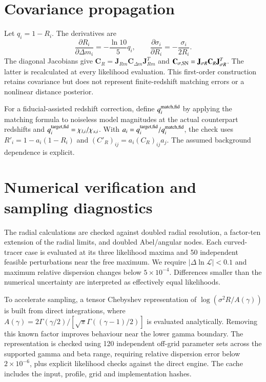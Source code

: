 \documentclass{aa}
\begin{document}
\section{Covariance propagation}\label{sec:propagation}
Let $q_i=1-R_i$. The derivatives are
\begin{equation}
\frac{\partial R_i}{\partial\Delta m_i}=-\frac{\ln10}{5}q_i,\qquad
\frac{\partial\sigma_i}{\partial R_i}=-\frac{\sigma_i}{2R_i}.
\end{equation}
The diagonal Jacobians give $\mathbf C_R=\mathbf J_{Rm}\mathbf C_{\Delta m}\mathbf J_{Rm}^{T}$ and $\mathbf C_{\sigma,{\rm SN}}=\mathbf J_{\sigma R}\mathbf C_R\mathbf J_{\sigma R}^{T}$. The latter is recalculated at every likelihood evaluation. This first-order construction retains covariance but does not represent finite-redshift matching errors or a nonlinear distance posterior.

For a fiducial-assisted redshift correction, define $q_i^{\rm match,fid}$ by applying the matching formula to noiseless model magnitudes at the actual counterpart redshifts and $q_i^{\rm target,fid}=\chi_{l,i}/\chi_{s,i}$. With $a_i=q_i^{\rm target,fid}/q_i^{\rm match,fid}$, the check uses $R'_i=1-a_i(1-R_i)$ and $(C'_R)_{ij}=a_i(C_R)_{ij}a_j$. The assumed background dependence is explicit.

\section{Numerical verification and sampling diagnostics}\label{sec:numerical}
The radial calculations are checked against doubled radial resolution, a factor-ten extension of the radial limits, and doubled Abel/angular nodes. Each curved-tracer case is evaluated at its three likelihood maxima and 50 independent feasible perturbations near the free maximum. We require $|\Delta\ln\mathcal L|<0.1$ and maximum relative dispersion changes below $5\times10^{-4}$. Differences smaller than the numerical uncertainty are interpreted as effectively equal likelihoods.

To accelerate sampling, a tensor Chebyshev representation of $\log(\sigma^2 R/A(\gamma))$ is built from direct integrations, where $A(\gamma)=2\Gamma(\gamma/2)/[\sqrt\pi\Gamma((\gamma-1)/2)]$ is evaluated analytically. Removing this known factor improves behaviour near the lower gamma boundary. The representation is checked using 120 independent off-grid parameter sets across the supported gamma and beta range, requiring relative dispersion error below $2\times10^{-6}$, plus explicit likelihood checks against the direct engine. The cache includes the input, profile, grid and implementation hashes.
\end{document}
